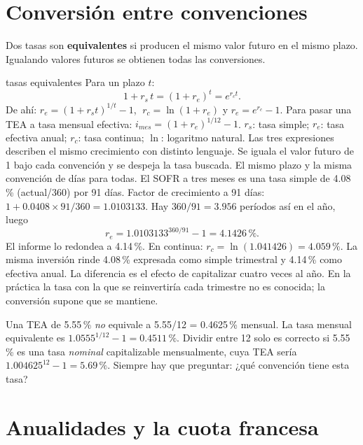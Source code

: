 \section{Conversión entre convenciones}

Dos tasas son \textbf{equivalentes} si producen el mismo valor futuro en el mismo plazo. Igualando valores futuros se obtienen todas las conversiones.

\begin{ficha}{tasas equivalentes}
 Para un plazo $t$:
\[ 1+r_s\,t=(1+r_e)^t=e^{r_c t}. \]
De ahí: $r_e=(1+r_s t)^{1/t}-1$, $\;r_c=\ln(1+r_e)$ y $r_e=e^{r_c}-1$. Para pasar una TEA a tasa mensual efectiva: $i_{mes}=(1+r_e)^{1/12}-1$.
 $r_s$: tasa simple; $r_e$: tasa efectiva anual; $r_c$: tasa continua; $\ln$: logaritmo natural.
 Las tres expresiones describen el mismo crecimiento con distinto lenguaje.
 Se iguala el valor futuro de 1 bajo cada convención y se despeja la tasa buscada.
 El mismo plazo y la misma convención de días para todas.
 El SOFR a tres meses es una tasa simple de 4.08\,\% (actual/360) por 91 días. Factor de crecimiento a 91 días: $1+0.0408\times91/360=1.0103133$. Hay $360/91=3.956$ períodos así en el año, luego
\[ r_e=1.0103133^{360/91}-1=4.1426\,\%. \]
El informe lo redondea a 4.14\,\%. En continua: $r_c=\ln(1.041426)=4.059\,\%$.
 La misma inversión rinde 4.08\,\% expresada como simple trimestral y 4.14\,\% como efectiva anual. La diferencia es el efecto de capitalizar cuatro veces al año.
 En la práctica la tasa con la que se reinvertiría cada trimestre no es conocida; la conversión supone que se mantiene.
\end{ficha}

\begin{cuidado}
Una TEA de 5.55\,\% \emph{no} equivale a 5.55/12 = 0.4625\,\% mensual. La tasa mensual equivalente es $1.0555^{1/12}-1=0.4511\,\%$. Dividir entre 12 solo es correcto si 5.55\,\% es una tasa \emph{nominal} capitalizable mensualmente, cuya TEA sería $1.004625^{12}-1=5.69\,\%$. Siempre hay que preguntar: ¿qué convención tiene esta tasa?
\end{cuidado}

\section{Anualidades y la cuota francesa}

